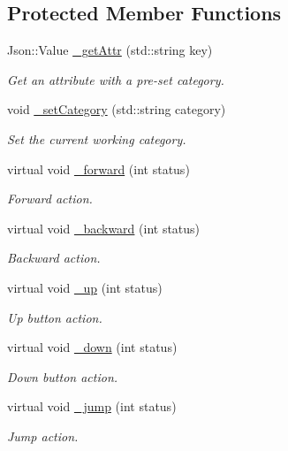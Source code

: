 \subsection*{Protected Member Functions}
\begin{DoxyCompactItemize}
\item 
Json\+::\+Value \hyperlink{class_characters_abd51b12301a105d11021ac3302c742ea}{\+\_\+get\+Attr} (std\+::string key)
\begin{DoxyCompactList}\small\item\em Get an attribute with a pre-\/set category. \end{DoxyCompactList}\item 
void \hyperlink{class_characters_a9a06365f3881336e2ee8509129ec54cd}{\+\_\+set\+Category} (std\+::string category)
\begin{DoxyCompactList}\small\item\em Set the current working category. \end{DoxyCompactList}\item 
virtual void \hyperlink{class_characters_af8dca1980a447965ffeb2ea17a507c5c}{\+\_\+forward} (int status)
\begin{DoxyCompactList}\small\item\em Forward action. \end{DoxyCompactList}\item 
virtual void \hyperlink{class_characters_ab5b3e9e9140665e9e358343d9b47ea1c}{\+\_\+backward} (int status)
\begin{DoxyCompactList}\small\item\em Backward action. \end{DoxyCompactList}\item 
virtual void \hyperlink{class_characters_a2bb63a2db8990e516cc2424f1dbf713a}{\+\_\+up} (int status)
\begin{DoxyCompactList}\small\item\em Up button action. \end{DoxyCompactList}\item 
virtual void \hyperlink{class_characters_a3253373f4bf97f623de6d758b464b553}{\+\_\+down} (int status)
\begin{DoxyCompactList}\small\item\em Down button action. \end{DoxyCompactList}\item 
virtual void \hyperlink{class_characters_afad45a33b0277605c50b90031371e00a}{\+\_\+jump} (int status)
\begin{DoxyCompactList}\small\item\em Jump action. \end{DoxyCompactList}\item 

\end{DoxyCompactItemize}
